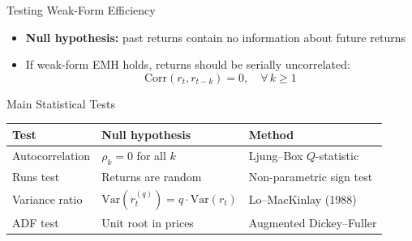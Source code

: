 \documentclass[9pt, aspectratio=169, t]{beamer}
\theoremstyle{definition}
\newenvironment{cminipage}[1]{%
    \par\noindent\hfill\begin{minipage}{#1}\ignorespaces
}{%
    \end{minipage}\hfill\null\par
}
\newcommand{\Var}{\text{Var}}
\newcommand{\Corr}{\text{Corr}}
\begin{document}
\begin{frame}{Testing Weak-Form Efficiency}
\begin{cminipage}{0.95\textwidth}
\begin{itemize}\setlength{\itemsep}{0pt}
    \item \textbf{Null hypothesis:} past returns contain no information about future returns
    \item If weak-form EMH holds, returns should be serially uncorrelated:
$$\Corr(r_t, r_{t-k}) = 0, \quad \forall\, k \geq 1$$
\end{itemize}

\vspace{0.2cm}
\begin{block}{Main Statistical Tests}
\renewcommand{\arraystretch}{1.2}
\small
\begin{tabular}{lll}
\toprule
\textbf{Test} & \textbf{Null hypothesis} & \textbf{Method} \\
\midrule
Autocorrelation & $\rho_k = 0$ for all $k$ & Ljung--Box $Q$-statistic \\
Runs test & Returns are random & Non-parametric sign test \\
Variance ratio & $\Var(r_t^{(q)}) = q \cdot \Var(r_t)$ & Lo--MacKinlay (1988) \\
ADF test & Unit root in prices & Augmented Dickey--Fuller \\
\bottomrule
\end{tabular}
\end{block}
\end{cminipage}
\end{frame}
\end{document}

